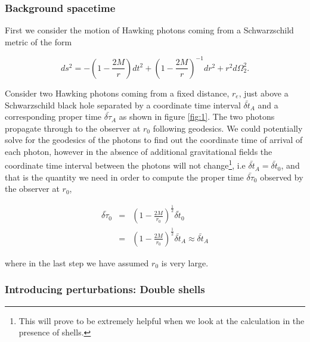 \documentclass[aps,showpacs,twocolumn,floats,prd,superscriptaddress,nofootinbib]{revtex4-1}
\begin{document}
\subsubsection{Background spacetime}

First we consider the motion of Hawking photons coming from a Schwarzschild metric of the form

\begin{equation}
	ds^2 = - \left( 1 - \frac{2M}{r} \right) dt^2 + \left( 1 - \frac{2M}{r} \right)^{-1} dr^2 + r^2 d \Omega_2^2.
\end{equation}

Consider two Hawking photons coming from a fixed distance, $r_{e}$, just above a Schwarzschild black hole separated by a coordinate time interval $\bar{\delta t}_A$ and a corresponding proper time $\bar{\delta \tau}_A$ as shown in figure \ref{fig:1}. The two photons propagate through to the observer at $r_0$ following geodesics. We could potentially solve for the geodesics of the photons to find out the coordinate time of arrival of each photon, however in the absence of additional gravitational fields the coordinate time interval between the photons will not change\footnote{This will prove to be extremely helpful when we look at the calculation in the presence of shells.}, i.e $\bar{\delta t}_A = \bar{\delta t}_0$, and that is the quantity we need in order to compute the proper time $\bar{\delta \tau}_0$ observed by the observer at $r_0$,

\begin{eqnarray}
	\bar{\delta \tau}_0 & = & \left( 1- \frac{2M}{r_0} \right)^\frac{1}{2} \bar{\delta t}_0	\nonumber	\\
	& = & \left( 1 - \frac{2M}{r_0} \right)^\frac{1}{2} \bar{\delta t}_A \approx \bar{\delta t}_{A} 
\end{eqnarray}

where in the last step we have assumed $r_0$ is very large.

\subsubsection{Introducing perturbations: Double shells}
\end{document}
